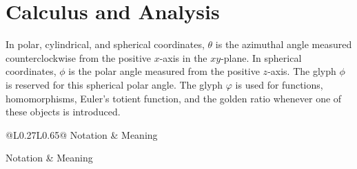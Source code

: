     \section*{Calculus and Analysis}

    In polar, cylindrical, and spherical coordinates, $\theta$ is the azimuthal
    angle measured counterclockwise from the positive $x$-axis in the
    $xy$-plane. In spherical coordinates, $\phi$ is the polar angle measured
    from the positive $z$-axis. The glyph $\phi$ is reserved for this spherical
    polar angle. The glyph $\varphi$ is used for functions, homomorphisms,
    Euler's totient function, and the golden ratio whenever one of these objects
    is introduced.

    \vspace{0.5em}

    {\small
    \renewcommand{\arraystretch}{1.18}
    \begin{longtable}{@{}L{0.27\textwidth}L{0.65\textwidth}@{}}
        \toprule
        Notation & Meaning \\
        \midrule
        \endfirsthead

        \toprule
        Notation & Meaning \\
        \midrule
        \endhead

        \bottomrule
        \endlastfoot


\end{longtable}}

